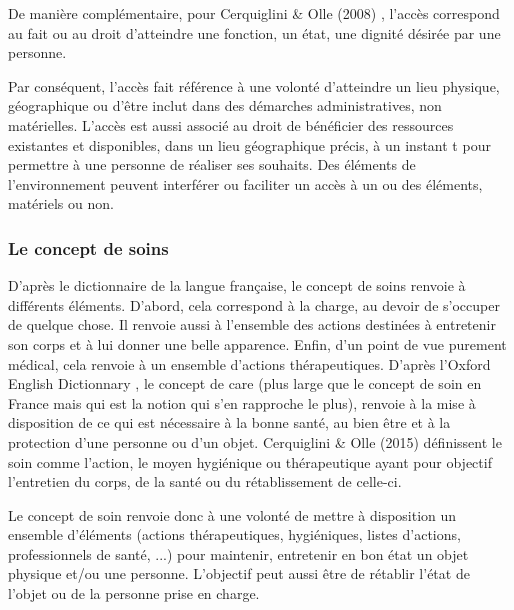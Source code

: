 De manière complémentaire, pour Cerquiglini \& Olle (2008) \cite{Cerquiglini2015}, l'accès correspond au fait ou au droit d'atteindre une fonction, un état, une dignité désirée par une personne.

Par conséquent, l'accès fait référence à une volonté d'atteindre un lieu physique, géographique ou d'être inclut dans des démarches administratives, non matérielles. L'accès est aussi associé au droit de bénéficier des ressources existantes et disponibles, dans un lieu géographique précis, à un instant t pour permettre à une personne de réaliser ses souhaits. Des éléments de l'environnement peuvent interférer ou faciliter un accès à un ou des éléments, matériels ou non.

\subsubsection{Le concept de soins}
D'après le dictionnaire de la langue française, le concept de \og soins \fg{} renvoie à différents éléments. D'abord, cela correspond à la charge, au devoir de s'occuper de quelque chose. Il renvoie aussi à l'ensemble des actions destinées à entretenir son corps et à lui donner une belle apparence. Enfin, d'un point de vue purement médical, cela renvoie à un ensemble d'actions thérapeutiques.
D'après l'Oxford English Dictionnary \cite{oxforddictionnary}, le concept de \og care\fg{} (plus large que le concept de \og soin\fg{} en France mais qui est la notion qui s'en rapproche le plus), renvoie à la mise à disposition de ce qui est nécessaire à la bonne santé, au bien être et à la protection d'une personne ou d'un objet.
Cerquiglini \& Olle (2015) \cite{DictionnaireHachette} définissent le soin comme l'action, le moyen hygiénique ou thérapeutique ayant pour objectif l'entretien du corps, de la santé ou du rétablissement de celle-ci.

Le concept de \og soin\fg{} renvoie donc à une volonté de mettre à disposition un ensemble d'éléments (actions thérapeutiques, hygiéniques, listes d'actions, professionnels de santé, ...) pour maintenir, entretenir en bon état un objet physique et/ou une personne. L'objectif peut aussi être de rétablir l'état de l'objet ou de la personne prise en charge.


